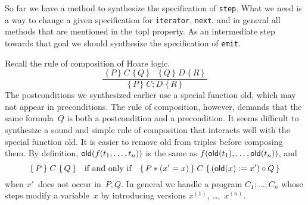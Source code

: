 \documentclass{article} %
\newcommand{\infer}[2]{\frac{\displaystyle\;#1\;}{\displaystyle\;#2\;}}
\newcommand{\3}[3]{\{\,#1\,\}\;#2\;\{\,#3\,\}}
\begin{document}
\medskip

So far we have a method to synthesize the specification of {\tt step}.
What we need is a way to change a given specification for {\tt iterator}, {\tt next}, and in general all methods that are mentioned in the topl property.
As an intermediate step towards that goal we should synthesize the specification of {\tt emit}.

Recall the rule of composition of Hoare logic.
\[\infer
  {\3{P}{C}{Q}\quad\3{Q}{D}{R}}
  {\3{P}{C;D}{R}}
\]
The postconditions we synthesized earlier use a special function {\sf old}, which may not appear in preconditions.
The rule of composition, however, demands that the same formula~$Q$ is both a postcondition and a precondition.
It seems difficult to synthesize a sound and simple rule of composition that interacts well with the special function {\sf old}.
It is easier to remove {\sf old} from triples before composing them.
By definition, ${\sf old}(f(t_1,\ldots,t_n))$ is the same as $f({\sf old}(t_1),\ldots,{\sf old}(t_n))$, and
\[
  \3{P}{C}{Q} \quad\text{if and only if}\quad
  \3{P*(x'=x)}{C}{({\sf old}(x):=x')\circ Q}
\]
when $x'$~does not occur in~$P,Q$.
In general we handle a program $C_1;\ldots;C_n$ whose steps modify a variable~$x$ by introducing versions $x^{(1)}$, \dots,~$x^{(n)}$.
\end{document}
